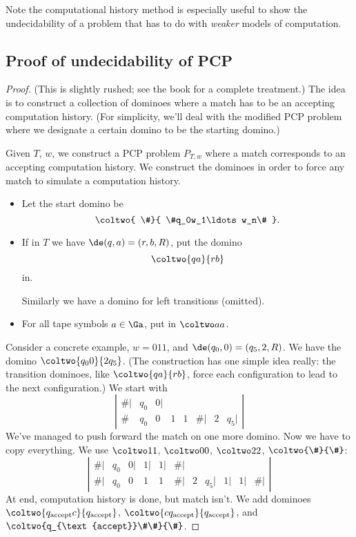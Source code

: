 Note the computational history method is especially useful to show the undecidability of a problem that has to do with {\it weaker} models of computation.

\subsection{Proof of undecidability of PCP}
\begin{proof} (This is slightly rushed; see the book for a complete treatment.) 
The idea is to construct a collection of dominoes where a match has to be an accepting computation history.  (For simplicity, we'll deal with the modified PCP problem where we designate a certain domino to be the starting domino.)


Given $T$, $w$, we construct a PCP problem $P_{T,w}$ where a match corresponds to an accepting computation history. We construct the dominoes in order to force any match to simulate a computation history. 
\begin{itemize}
\item
Let the start domino be
\[
\coltwo{
\#}{
\#q_0w_1\ldots w_n\#
}.
\]
\item
If in $T$ %
we have $\de(q,a)=(r,b,R)$, put the domino
\[
\coltwo{qa}{rb}
\]
in. %

Similarly we have a domino for left transitions (omitted).
\item
For all tape symbols $a\in \Ga$, put in $\coltwo aa$. %
\end{itemize}


Consider a concrete example, $w=011$, and $\de(q_0,0)=(q_5,2,R)$. We have the domino $\coltwo{q_00}{2q_5}$. (The construction has one simple idea really: the transition dominoes, like $\coltwo{qa}{rb}$, force each configuration to lead to the next configuration.) We start with
\[
\left|
\begin{array}{cccccccc}
\# | & q_0 &0|&&&&&\\
\# & q_0&0& 1& 1& \#|& 2& q_5| 
\end{array}
\right|
\] 
We've managed to push forward the match on one more domino. Now we have to copy everything. We use $\coltwo 11$, $\coltwo 00$, $\coltwo 22$, $\coltwo{\#}{\#}$:
\[
\left|
\begin{array}{ccccccccccc}
\# | & q_0 &0|&1|&1|&\#|&&&&\\
\#| & q_0& 0&1& 1& \#|& 2& q_5| & 1| & 1| & \#|
\end{array}
\right|
\] 
At end, computation history is done, but match isn't. We add dominoes $\coltwo{q_{\text{accept}}c}{q_{\text{accept}}}$, $\coltwo{cq_{\text{accept}}}{q_{\text{accept}}}$, and $\coltwo{q_{\text{accept}}\#\#}{\#}$.


\end{proof}
